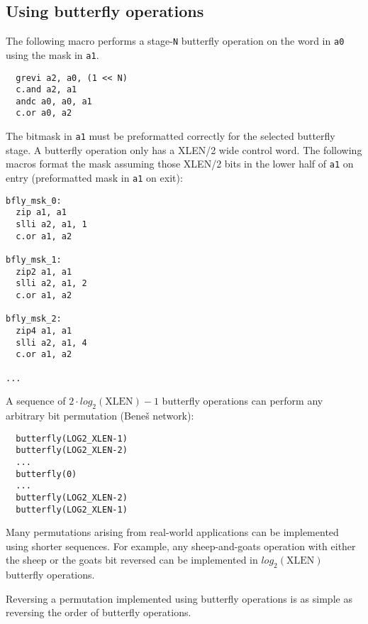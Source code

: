 \subsection{Using butterfly operations}
\label{butterfly}

The following macro performs a stage-{\tt N} butterfly operation on the word in
{\tt a0} using the mask in {\tt a1}.

\begin{verbatim}
  grevi a2, a0, (1 << N)
  c.and a2, a1
  andc a0, a0, a1
  c.or a0, a2
\end{verbatim}

The bitmask in {\tt a1} must be preformatted correctly for the selected butterfly
stage. A butterfly operation only has a XLEN/2 wide control word. The following
macros format the mask assuming those XLEN/2 bits in the lower half of {\tt a1}
on entry (preformatted mask in {\tt a1} on exit):

\begin{verbatim}
bfly_msk_0:
  zip a1, a1
  slli a2, a1, 1
  c.or a1, a2

bfly_msk_1:
  zip2 a1, a1
  slli a2, a1, 2
  c.or a1, a2

bfly_msk_2:
  zip4 a1, a1
  slli a2, a1, 4
  c.or a1, a2

...
\end{verbatim}

A sequence of $2\cdot{}log_2(\textrm{XLEN})-1$ butterfly operations can perform any
arbitrary bit permutation (Bene{\v s} network):

\begin{verbatim}
  butterfly(LOG2_XLEN-1)
  butterfly(LOG2_XLEN-2)
  ...
  butterfly(0)
  ...
  butterfly(LOG2_XLEN-2)
  butterfly(LOG2_XLEN-1)
\end{verbatim}


Many permutations arising from real-world applications can be implemented
using shorter sequences. For example, any sheep-and-goats operation with either
the sheep or the goats bit reversed can be implemented in $log_2(\textrm{XLEN})$
butterfly operations.

Reversing a permutation implemented using butterfly operations is as simple as
reversing the order of butterfly operations.


